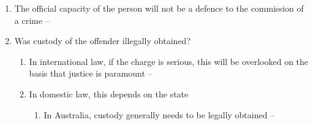 \begin{enumerate}
\begin{enumerate}
        \item The official capacity of the person will not be a defence to the commission of a crime -- 
        \item Was custody of the offender illegally obtained?
        \begin{enumerate}
            \item In international law, if the charge is serious, this will be overlooked on the basis that justice is paramount -- 
            \item In domestic law, this depends on the state
            \begin{enumerate}
                \item In Australia, custody generally needs to be legally obtained -- 
            \end{enumerate}
        \end{enumerate}
    \end{enumerate}
\end{enumerate}


